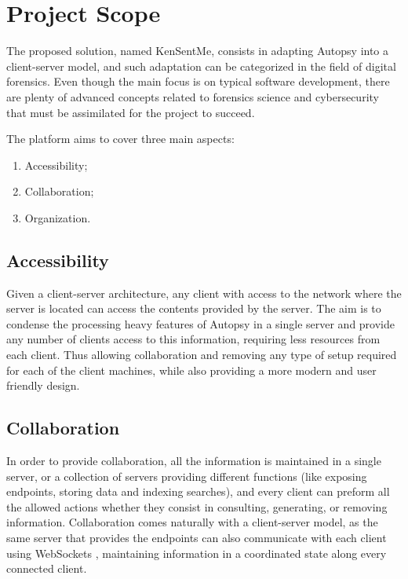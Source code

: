 \section{Project Scope}

The proposed solution, named KenSentMe, consists in adapting Autopsy into a client-server model, and such adaptation can be categorized in the field of digital forensics. 
Even though the main focus is on typical software development, there are plenty of advanced concepts related to forensics science and cybersecurity 
that must be assimilated for the project to succeed.

The platform aims to cover three main aspects:
\begin{enumerate}
 \item Accessibility;
 \item Collaboration;
 \item Organization.
\end{enumerate}

\subsection{Accessibility}

Given a client-server architecture, any client with access to the network where the server is located can access the contents provided by the server.
The aim is to condense the processing heavy features of Autopsy in a single server and provide any number of clients access to this information, requiring less 
resources from each client. Thus allowing collaboration and removing any type of setup required for each of the client machines, while also providing a more modern 
and user friendly design.

\subsection{Collaboration}

In order to provide collaboration, all the information is maintained in a single server, or a collection of servers providing different functions (like exposing endpoints,
storing data and indexing searches), and every client can preform all the allowed actions whether they consist in consulting, generating, or removing information. 
Collaboration comes naturally with a client-server model, as the same server that provides the endpoints can also communicate with each client using WebSockets \cite{websockets}, maintaining 
information in a coordinated state along every connected client.

